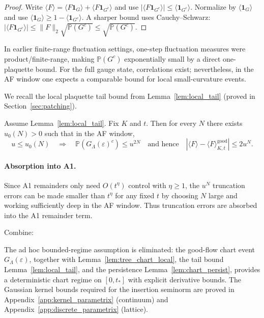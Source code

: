 \begin{proof}
Write $\langle F\rangle=\langle F\mathbf 1_G\rangle+\langle F\mathbf 1_{G^c}\rangle$ and use $|\langle F\mathbf 1_{G^c}\rangle|\le \langle \mathbf 1_{G^c}\rangle$.
Normalize by $\langle \mathbf 1_G\rangle$ and use $\langle\mathbf 1_G\rangle\ge 1-\langle\mathbf 1_{G^c}\rangle$.
A sharper bound uses Cauchy--Schwarz: $|\langle F\mathbf 1_{G^c}\rangle|\le \|F\|_2\sqrt{\mathbb P(G^c)}\le \sqrt{\mathbb P(G^c)}$.
\end{proof}

In earlier finite-range fluctuation settings, one-step fluctuation measures were product/finite-range, making $\mathbb P(G^c)$ exponentially small by a direct one-plaquette bound.
For the full gauge state, correlations exist; nevertheless, in the AF window one expects a comparable bound for local small-curvature events.

We recall the local plaquette tail bound from Lemma~\ref{lem:local_tail} (proved in Section~\ref{sec:patching}).

\begin{corollary}\label{cor:superpoly_flow}
Assume Lemma~\ref{lem:local_tail}. Fix $K$ and $t$. Then for every $N$ there exists $u_0(N)>0$ such that in the AF window,
\[
u\le u_0(N)\quad\Longrightarrow\quad
\mathbb P(G_{\Lambda}(\varepsilon)^c)\le u^{2N}
\quad\text{and hence}\quad
|\langle F\rangle-\langle F\rangle^{\mathrm{good}}_{K,t}|\le 2u^{N}.
\]
\end{corollary}

\paragraph{Absorption into A1.}
Since A1 remainders only need $O(t^\eta)$ control with $\eta\ge 1$, the $u^N$ truncation errors can be made smaller than $t^\eta$ for any fixed $t$
by choosing $N$ large and working sufficiently deep in the AF window. Thus truncation errors are absorbed into the A1 remainder term.

Combine:
\begin{remark}\MainPath
The ad hoc bounded-regime assumption is eliminated: the good-flow chart event $G_{\Lambda}(\varepsilon)$,
together with Lemma~\ref{lem:tree_chart_local}, the tail bound Lemma~\ref{lem:local_tail},
and the persistence Lemma~\ref{lem:chart_persist}, provides a deterministic chart regime on $[0,t_\ast]$ with explicit derivative bounds.
The Gaussian kernel bounds required for the insertion seminorm are proved in Appendix~\ref{app:kernel_parametrix}
(continuum) and Appendix~\ref{app:discrete_parametrix} (lattice).
\end{remark}
